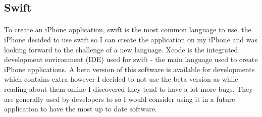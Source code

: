 \documentclass[11pt]{article}
\begin{document}




                 
            \subsection{Swift}
               
                \paragraph{} 
                    To create an iPhone application, swift is the most common language to use.  the iPhone decided to use swift so I can create the application on my iPhone and was looking forward to the challenge of a new language. Xcode is the integrated development environment (IDE) used for swift - the main language used to create iPhone applications. A beta version of this software is available for developments which contains extra however I decided to not use the beta version as while reading about them online I discovered they tend to have a lot more bugs. They are generally used by developers to so I would consider using it in a future application to have the most up to date software.
\end{document}
